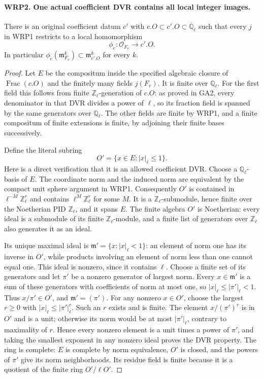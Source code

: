 \documentclass[11pt,a4paper]{article}
\numberwithin{equation}{section}
\theoremstyle{remark}\newtheorem{remark}[theorem]{Remark}
\begin{document}
\paragraph{WRP2. One actual coefficient DVR contains all local integer images.}
\label{claim:WRP2}
There is an original coefficient datum $c'$ with
$c.O\subset c'.O\subset\overline{\mathbb Q}_\ell$ such that
every $j$ in WRP1 restricts to a local homomorphism
\[
               \phi_e:\mathcal O_{F_v}\longrightarrow c'.O.
\]
In particular $\phi_e(\mathfrak m_{F_v}^k)
\subset\mathfrak m_{c'.O}^k$ for every $k$.
\begin{proof}
Let $E$ be the compositum inside the specified algebraic closure
of $\operatorname{Frac}(c.O)$ and the finitely many fields
$j(F_v)$.  It is finite over $\mathbb Q_\ell$.  For the first
field this follows from finite $\mathbb Z_\ell$-generation of
$c.O$: as proved in GA2, every denominator in that DVR divides
a power of $\ell$, so its fraction field is spanned by the
same generators over $\mathbb Q_\ell$.  The other fields are
finite by WRP1, and a finite compositum of finite extensions
is finite, by adjoining their finite bases successively.

Define the literal subring
\[
                       O'=\{x\in E:|x|_\ell\leq1\}.
\]
Here is a direct verification that it is an allowed coefficient
DVR.  Choose a $\mathbb Q_\ell$-basis of $E$.  The coordinate
norm and the induced norm are equivalent by the compact unit
sphere argument in WRP1.  Consequently $O'$ is contained
in $\ell^{-M}\mathbb Z_\ell^r$ and contains
$\ell^M\mathbb Z_\ell^r$ for some $M$.  It is a
$\mathbb Z_\ell$-submodule, hence finite over the Noetherian
PID $\mathbb Z_\ell$, and it spans $E$.  The finite algebra
$O'$ is Noetherian: every ideal is a submodule of its finite
$\mathbb Z_\ell$-module, and a finite list of generators
over $\mathbb Z_\ell$ also generates it as an ideal.

Its unique maximal ideal is
$\mathfrak m' =\{x:|x|_\ell<1\}$: an element of norm one
has its inverse in $O'$, while products involving an element
of norm less than one cannot equal one.  This ideal is
nonzero, since it contains $\ell$.  Choose a finite set of
its generators and let $\pi'$ be a nonzero generator of
largest norm.  Every $x\in\mathfrak m'$ is a sum of these
generators with coefficients of norm at most one, so
$|x|_\ell\leq|\pi'|_\ell<1$.  Thus $x/\pi'\in O'$,
and $\mathfrak m'=(\pi')$.  For any nonzero $x\in O'$,
choose the largest $r\geq0$ with
$|x|_\ell\leq|\pi'|_\ell^r$.  Such an $r$ exists and is
finite.  The element $x/(\pi')^r$ is in $O'$ and is a unit;
otherwise its norm would be at most $|\pi'|_\ell$, contrary
to maximality of $r$.  Hence every nonzero element is a unit
times a power of $\pi'$, and taking the smallest exponent
in any nonzero ideal proves the DVR property.  The ring is
complete: $E$ is complete by norm equivalence, $O'$ is
closed, and the powers of $\pi'$ give its norm neighborhoods.
Its residue field is finite because it is a quotient of the
finite ring $O'/\ell O'$.


\end{proof}
\end{document}
